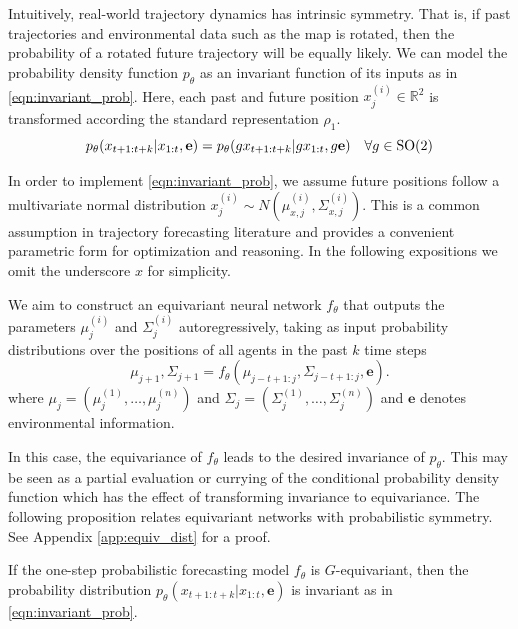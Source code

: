 Intuitively, real-world trajectory dynamics has intrinsic symmetry. That is, if past trajectories and environmental data such as the map is rotated, then the probability of a rotated future trajectory will be equally likely. We can model the probability density function $p_\theta$ as an invariant function of its inputs as in \autoref{eqn:invariant_prob}. Here, each past and future position $x^{(i)}_j \in \mathbb{R}^2$ is transformed according the standard representation $\rho_1$.  
\begin{equation} \label{eqn:invariant_prob}   
    p_\theta( {x}_{t+1:t+k} | {x}_{1:t}, \mathbf{e}) = p_\theta( g{x}_{t+1:t+k} | g{x}_{1:t}, g\mathbf{e}) \quad \forall g\in \mathrm{SO}(2)
\end{equation}



In order to implement \autoref{eqn:invariant_prob}, we 
assume future positions  follow a multivariate normal distribution ${x}^{(i)}_{j} \sim N(\mu^{(i)}_{x,j},\Sigma^{(i)}_{x,j})$. This is a common assumption in trajectory forecasting literature \cite{trajpredsurvey} and provides a convenient parametric form for optimization and reasoning. In the following expositions we omit the underscore $x$ for simplicity.

We aim to construct an equivariant neural network $f_\theta$ that outputs the parameters $\mu^{(i)}_{j}$ and $\Sigma^{(i)}_{j}$ autoregressively, taking as input probability distributions over the positions of all agents in the past $k$ time steps
\[
\mu_{j+1},\Sigma_{j+1} = f_\theta(\mu_{j-t+1:j}, \Sigma_{j-t+1:j}, \mathbf{e}). 
\]
where $\mu_{j} = (\mu_{j}^{(1)},\ldots,\mu_{j}^{(n)})$ and $\Sigma_j = (\Sigma_{j}^{(1)},\ldots,\Sigma_{j}^{(n)})$ and $\mathbf{e}$ denotes environmental information.  

In this case, the equivariance of $f_\theta$ leads to the desired invariance of $p_\theta$. This may be seen as a partial evaluation or currying of the conditional probability density function which has the effect of transforming invariance to equivariance. The following proposition relates equivariant networks with probabilistic symmetry. See Appendix \ref{app:equiv_dist} for a proof.
\begin{proposition} \label{prop:equivtoinvar}
If the one-step probabilistic forecasting model $f_\theta$ is $G$-equivariant, then the probability distribution $p_\theta( x_{t+1:t+k} | x_{1:t}, \mathbf{e})$ is invariant as in \autoref{eqn:invariant_prob}.
\end{proposition}

